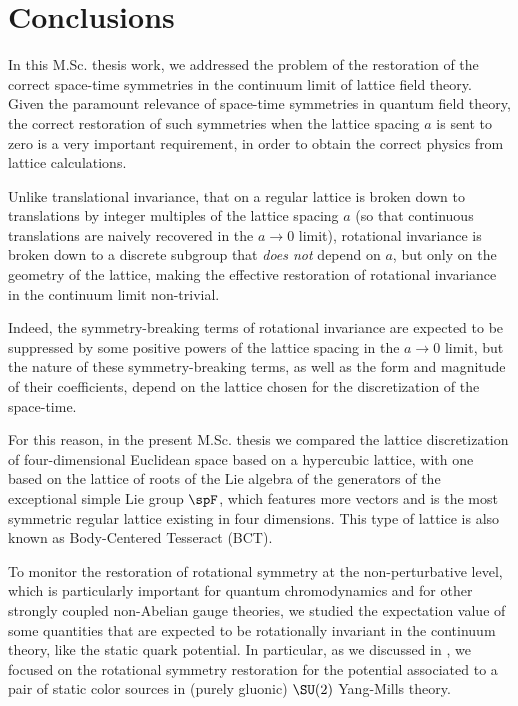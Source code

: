 \pagestyle{myFancy}
\chapter{Conclusions}

In this M.Sc. thesis work, we addressed the problem of the restoration of the correct space-time symmetries in the continuum limit of lattice field theory.
Given the paramount relevance of space-time symmetries in quantum field theory, the correct restoration of such symmetries when the lattice spacing $a$ is sent to zero is a very important requirement, in order to obtain the correct physics from lattice calculations.

Unlike translational invariance, that on a regular lattice is broken down to translations by integer multiples of the lattice spacing $a$ (so that continuous translations are naively recovered in the $a \to 0$ limit), rotational invariance is broken down to a discrete subgroup that \emph{does not} depend on $a$, but only on the geometry of the lattice, making the effective restoration of rotational invariance in the continuum limit non-trivial.

Indeed, the symmetry-breaking terms of rotational invariance are expected to be suppressed by some positive powers of the lattice spacing in the $a\to 0$ limit, but the nature of these symmetry-breaking terms, as well as the form and magnitude of their coefficients, depend on the lattice chosen for the discretization of the space-time.

For this reason, in the present M.Sc. thesis we compared the lattice discretization of four-dimensional Euclidean space based on a hypercubic lattice, with one based on the lattice of roots of the Lie algebra of the generators of the exceptional simple Lie group $\spF$, which features more vectors and is the most symmetric regular lattice existing in four dimensions.
This type of lattice is also known as Body-Centered Tesseract (BCT).

To monitor the restoration of rotational symmetry at the non-perturbative level, which is particularly important for quantum chromodynamics and for other strongly coupled non-Abelian gauge theories, we studied the expectation value of some quantities that are expected to be rotationally invariant in the continuum theory, like the static quark potential.
In particular, as we discussed in , we focused on the rotational symmetry restoration for the potential associated to a pair of static color sources in (purely gluonic) $\SU(2)$ Yang-Mills theory.

